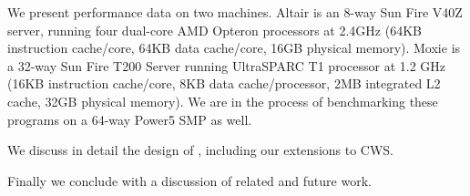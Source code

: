 We present performance data on two machines. Altair is an 8-way Sun
Fire V40Z server, running four dual-core AMD Opteron processors at
2.4GHz (64KB instruction cache/core, 64KB data cache/core, 16GB
physical memory). Moxie is a 32-way Sun Fire T200 Server running
UltraSPARC T1 processor at 1.2 GHz (16KB instruction cache/core, 8KB
data cache/processor, 2MB integrated L2 cache, 32GB physical
memory). We are in the process of benchmarking these programs on a
64-way Power5 SMP as well. 

We discuss in detail the design of \XWS, including our extensions to CWS.

Finally we conclude with a discussion of related and future work.


  